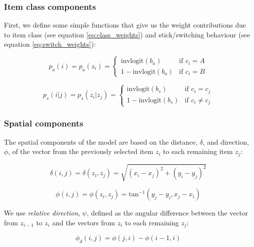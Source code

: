 \documentclass[man, floatsintext]{apa7}
\begin{document}
\subsubsection{Item class components} 

First, we define some simple functions that give us the weight contributions due to item class (see equation \ref{eq:class_weights}) and stick/switching behaviour (see equation \ref{eq:switch_weights}):

\begin{equation}
\label{eq:class_weights}
p_{a}(i) = p_a(z_i) = 
\begin{cases}
\text{invlogit}(b_a) & \text{if $c_i=A$} \\
1-\text{invlogit}(b_a) & \text{if $c_i=B$}
\end{cases}
\end{equation}

\begin{equation}
\label{eq:switch_weights}
p_s(i| j) = p_s(z_i|z_j) = 
\begin{cases}
\text{invlogit}(b_s) & \text{if $c_i=c_j$} \\
1-\text{invlogit}(b_s) & \text{if $c_i\neq c_j$}
\end{cases}
\end{equation}

\subsubsection{Spatial components}

The spatial components of the model are based on the distance, $\delta$, and direction, $\phi$, of the vector from the previously selected item $z_i$ to each remaining item $z_j$:

\begin{equation}
\label{eq:delta}
    \delta(i, j) = \delta(z_i, z_j) = \sqrt{(x_i - x_j)^2 + (y_i-y_j)^2}
\end{equation}

\begin{equation}
\label{eq:phi}
    \phi(i, j) =  \phi(z_i, z_j) = \text{tan}^{-1}(y_j-y_i, x_j-x_i)
\end{equation}

We use \textit{relative direction}, $\psi$, defined as the angular difference between the vector from $z_{i-1}$ to $z_i$ and the vectors from $z_i$ to each remaining $z_j$:

\begin{equation}
    \phi_d(i, j) =  \phi(j, i) - \phi(i-1, i) 
\end{equation}
\end{document}
